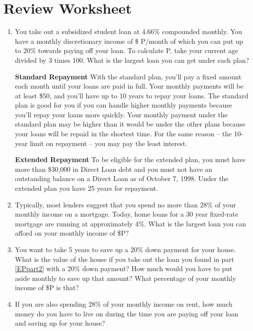 \clearpage
\ifsolns
\section{Review Worksheet}
\begin{enumerate}
	\item 	You take out a subsidized student loan at 4.66\% compounded monthly.  You have a monthly discretionary income  of \$ P/month of which you can put up to 20\% towards paying off your loan.  To calculate P, take your current age divided by 3 times 100.  What is the largest loan you can get under each plan?

\textbf{Standard Repayment}
With the standard plan, you'll pay a fixed amount each month until your loans are paid in full. Your monthly payments will be at least \$50, and you'll have up to 10 years to repay your loans.
The standard plan is good for you if you can handle higher monthly payments because you'll repay your loans more quickly. Your monthly payment under the standard plan may be higher than it would be under the other plans because your loans will be repaid in the shortest time. For the same reason -- the 10-year limit on repayment -- you may pay the least interest.

\textbf{Extended Repayment}
To be eligible for the extended plan, you must have more than \$30,000 in Direct Loan debt and you must not have an outstanding balance on a Direct Loan as of October 7, 1998. Under the extended plan you have 25 years for repayment.

\item	Typically, most lenders suggest that you spend no more than 28\% of your monthly income on a mortgage.  Today, home loans for a 30 year fixed-rate mortgage are running at approximately 4\%.  What is the largest loan you can afford on your monthly income of \$P?\label{EPpart2}
\item	You want to take 5 years to save up a 20\% down payment for your house.  What is the value of the house if you take out the loan you found in part \ref{EPpart2} with a 20\% down payment?  How much would you have to put aside monthly to save up that amount?  What percentage of your monthly income of \$P is that?
\item	If you are also spending 28\% of your monthly income on rent, how much money do you have to live on during the time you are paying off your loan and saving up for your house?
\end{enumerate}
